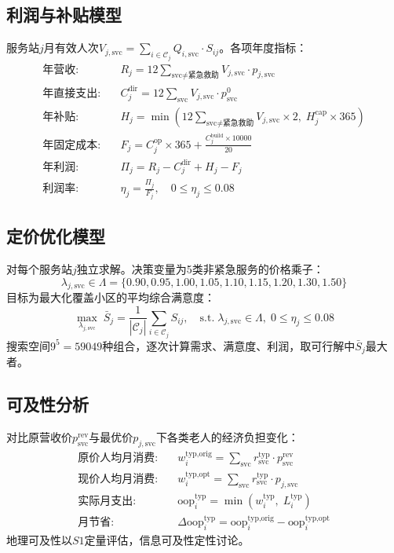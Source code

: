 \documentclass[12pt,a4paper]{article}
\begin{document}
\subsection{利润与补贴模型}
服务站$j$月有效人次$V_{j,\text{svc}} = \sum_{i\in\mathcal{C}_j} Q_{i,\text{svc}}\cdot S_{ij}$。各项年度指标：
\begin{align}
\text{年营收:}\quad & R_j = 12 \sum_{\text{svc}\neq\text{紧急救助}} V_{j,\text{svc}}\cdot p_{j,\text{svc}} \\
\text{年直接支出:}\quad & C_j^{\text{dir}} = 12 \sum_{\text{svc}} V_{j,\text{svc}}\cdot p_{\text{svc}}^0 \\
\text{年补贴:}\quad & H_j = \min\left(12\sum_{\text{svc}\neq\text{紧急救助}} V_{j,\text{svc}}\times 2,\; H_j^{\text{cap}}\times 365\right) \\
\text{年固定成本:}\quad & F_j = C_j^{\text{op}}\times 365 + \frac{C_j^{\text{build}}\times10000}{20} \\
\text{年利润:}\quad & \Pi_j = R_j - C_j^{\text{dir}} + H_j - F_j \\
\text{利润率:}\quad & \eta_j = \frac{\Pi_j}{F_j},\quad 0\leq\eta_j\leq0.08
\label{eq:profit}
\end{align}

\subsection{定价优化模型}
对每个服务站$j$独立求解。决策变量为5类非紧急服务的价格乘子：
\begin{equation}
\lambda_{j,\text{svc}}\in\Lambda=\{0.90,0.95,1.00,1.05,1.10,1.15,1.20,1.30,1.50\}
\label{eq:Lambda}
\end{equation}
目标为最大化覆盖小区的平均综合满意度：
\begin{equation}
\boxed{\max_{\lambda_{j,\text{svc}}}\; \bar{S}_j = \frac{1}{|\mathcal{C}_j|}\sum_{i\in\mathcal{C}_j} S_{ij},\quad \text{s.t.}\; \lambda_{j,\text{svc}}\in\Lambda,\; 0\leq\eta_j\leq0.08}
\label{eq:opt}
\end{equation}
搜索空间$9^5=59049$种组合，逐次计算需求、满意度、利润，取可行解中$\bar{S}_j$最大者。

\subsection{可及性分析}
对比原营收价$p_{\text{svc}}^{\text{rev}}$与最优价$p_{j,\text{svc}}$下各类老人的经济负担变化：
\begin{align}
\text{原价人均月消费:}\quad & w_i^{\text{typ,orig}} = \sum_{\text{svc}} r_{\text{svc}}^{\text{typ}}\cdot p_{\text{svc}}^{\text{rev}} \\
\text{现价人均月消费:}\quad & w_i^{\text{typ,opt}} = \sum_{\text{svc}} r_{\text{svc}}^{\text{typ}}\cdot p_{j,\text{svc}} \\
\text{实际月支出:}\quad & \text{oop}_i^{\text{typ}} = \min\left(w_i^{\text{typ}},\; L_i^{\text{typ}}\right) \\
\text{月节省:}\quad & \Delta\text{oop}_i^{\text{typ}} = \text{oop}_i^{\text{typ,orig}} - \text{oop}_i^{\text{typ,opt}}
\label{eq:access}
\end{align}
地理可及性以$S1$定量评估，信息可及性定性讨论。
\end{document}
